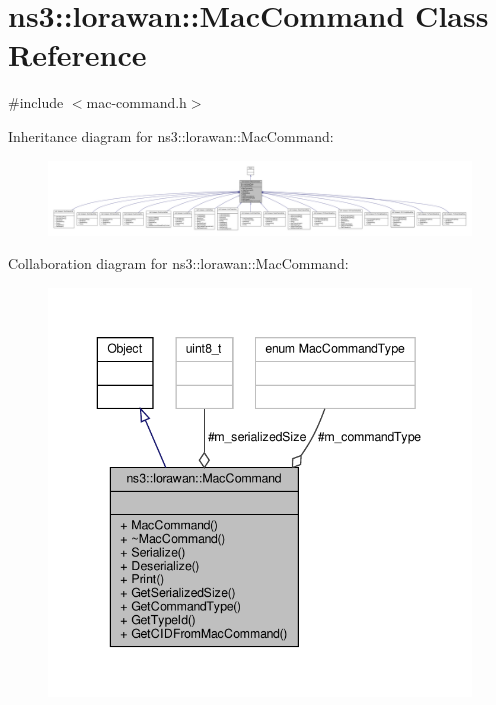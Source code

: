 \hypertarget{classns3_1_1lorawan_1_1MacCommand}{}\section{ns3\+:\+:lorawan\+:\+:Mac\+Command Class Reference}
\label{classns3_1_1lorawan_1_1MacCommand}


{\ttfamily \#include $<$mac-\/command.\+h$>$}



Inheritance diagram for ns3\+:\+:lorawan\+:\+:Mac\+Command\+:
\nopagebreak
\begin{figure}[H]
\begin{center}
\leavevmode
\includegraphics[width=350pt]{classns3_1_1lorawan_1_1MacCommand__inherit__graph}
\end{center}
\end{figure}


Collaboration diagram for ns3\+:\+:lorawan\+:\+:Mac\+Command\+:
\nopagebreak
\begin{figure}[H]
\begin{center}
\leavevmode
\includegraphics[width=343pt]{classns3_1_1lorawan_1_1MacCommand__coll__graph}
\end{center}
\end{figure}
